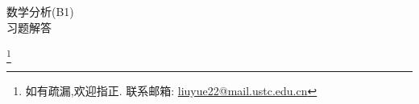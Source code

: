 \documentclass[lang=cn,12pt,scheme=chinese,founder,mode=simple,black,twoside]{elegantbook}
\newcommand\blfootnote[1]{%
    \begingroup
    \renewcommand\thefootnote{}%
    \footnote{#1}%
    \addtocounter{footnote}{-1}%
    \endgroup
}
\begin{document}
\begin{titlepage}
    \vspace*{\fill} %
    \begin{center}
        {\Huge 数学分析(B1)} \\[1cm]

        {\Large} 习题解答\\[0.8cm]
    \end{center}
    \vspace*{\fill} %

    \blfootnote{如有疏漏,欢迎指正. 联系邮箱: \url{liuyue22@mail.ustc.edu.cn}}
\end{titlepage}

\tableofcontents

\mainmatter





\end{document}
